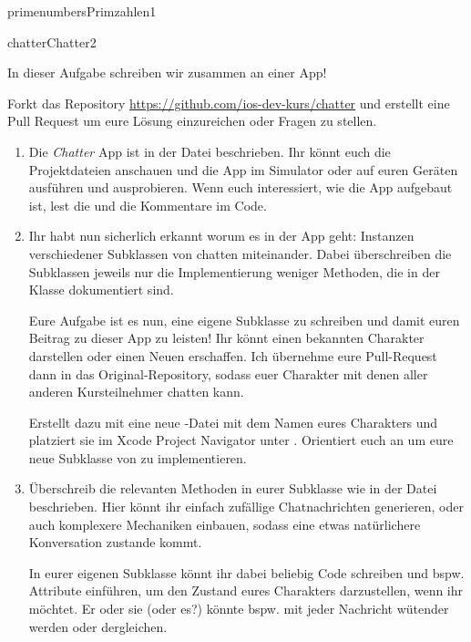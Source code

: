 \documentclass[parskip=half, final]{scrreprt}
\begin{document}
\begin{lecture}
\begin{exc}
\begin{excitem*}{primenumbers}{Primzahlen}{1}
\end{excitem*}


\begin{excitem}{chatter}{Chatter}{2}

In dieser Aufgabe schreiben wir zusammen an einer App!

Forkt das Repository \url{https://github.com/ios-dev-kurs/chatter} und erstellt eine Pull Request um eure Lösung einzureichen oder Fragen zu stellen.

\begin{enumerate}[label=\roman*.]

\item Die \emph{Chatter} App ist in der  Datei beschrieben. Ihr könnt euch die Projektdateien anschauen und die App im Simulator oder auf euren Geräten ausführen und ausprobieren. Wenn euch interessiert, wie die App aufgebaut ist, lest die  und die Kommentare im Code.

\item Ihr habt nun sicherlich erkannt worum es in der App geht: Instanzen verschiedener Subklassen von  chatten miteinander. Dabei überschreiben die Subklassen jeweils nur die Implementierung weniger Methoden, die in der  Klasse dokumentiert sind.

Eure Aufgabe ist es nun, eine eigene Subklasse zu schreiben und damit euren Beitrag zu dieser App zu leisten! Ihr könnt einen bekannten Charakter darstellen oder einen Neuen erschaffen. Ich übernehme eure Pull-Request dann in das Original-Repository, sodass euer Charakter mit denen aller anderen Kursteilnehmer chatten kann.

Erstellt dazu mit  eine neue -Datei mit dem Namen eures Charakters und platziert sie im Xcode Project Navigator unter . Orientiert euch an  um eure neue Subklasse von  zu implementieren.

\item Überschreib die relevanten Methoden in eurer Subklasse wie in der  Datei beschrieben. Hier könnt ihr einfach zufällige Chatnachrichten generieren, oder auch komplexere Mechaniken einbauen, sodass eine etwas natürlichere Konversation zustande kommt.

In eurer eigenen Subklasse könnt ihr dabei beliebig Code schreiben und bspw. Attribute einführen, um den Zustand eures Charakters darzustellen, wenn ihr möchtet. Er oder sie (oder es?) könnte bspw. mit jeder Nachricht wütender werden oder dergleichen.


\end{enumerate}
\end{excitem}
\end{exc}
\end{lecture}
\end{document}
